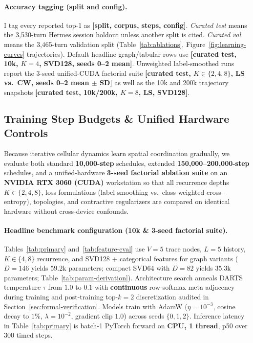 \documentclass[10pt,twocolumn,letterpaper]{article}
\begin{document}
\paragraph{Accuracy tagging (split and config).}
I tag every reported top-1 as \textbf{[split, corpus, steps, config]}. \emph{Curated test} means the 3{,}530-turn Hermes session holdout unless another split is cited. \emph{Curated val} means the 3{,}465-turn validation split (Table~\ref{tab:ablations}, Figure~\ref{fig:learning-curves} trajectories). Default headline graph/tabular rows use \textbf{[curated test, 10k, $K{=}4$, SVD128, seeds 0--2 mean]}. Unweighted label-smoothed runs report the 3-seed unified-CUDA factorial suite \textbf{[curated test, $K \in \{2,4,8\}$, LS vs.\ CW, seeds 0--2 mean $\pm$ SD]} as well as the 10k and 200k trajectory snapshots \textbf{[curated test, 10k/200k, $K{=}8$, LS, SVD128]}.

\subsection{Training Step Budgets \& Unified Hardware Controls}
Because iterative cellular dynamics learn spatial coordination gradually, we evaluate both standard \textbf{10{,}000-step} schedules, extended \textbf{150{,}000--200{,}000-step} schedules, and a unified-hardware \textbf{3-seed factorial ablation suite} on an \textbf{NVIDIA RTX 3060 (CUDA)} workstation so that all recurrence depths $K \in \{2, 4, 8\}$, loss formulations (label smoothing vs.\ class-weighted cross-entropy), topologies, and contractive regularizers are compared on identical hardware without cross-device confounds.

\paragraph{Headline benchmark configuration (10k \& 3-seed factorial suite).}
Tables~\ref{tab:primary} and~\ref{tab:feature-eval} use $V=5$ trace nodes, $L=5$ history, $K \in \{4, 8\}$ recurrence, and SVD128 + categorical features for graph variants ($D=146$ yields $59.2\text{k}$ parameters; compact SVD64 with $D=82$ yields $35.3\text{k}$ parameters; Table~\ref{tab:param-derivation}). Architecture search anneals DARTS temperature $\tau$ from $1.0$ to $0.1$ with \textbf{continuous} row-softmax meta adjacency during training and post-training top-$k{=}2$ discretization audited in Section~\ref{sec:formal-verification}. Models train with AdamW ($\eta=10^{-3}$, cosine decay to $1\%$, $\lambda=10^{-2}$, gradient clip $1.0$) across seeds $\{0,1,2\}$. Inference latency in Table~\ref{tab:primary} is batch-1 PyTorch forward on \textbf{CPU, 1 thread}, p50 over 300 timed steps.
\end{document}
